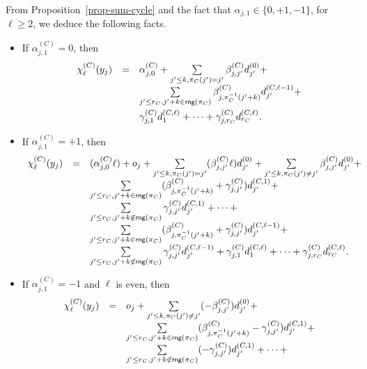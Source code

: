 \documentclass[runningheads,a4paper]{llncs}
\newcommand\rng{\mathsf{rng}}
\begin{document}
From Proposition~\ref{prop-sum-cycle} and the fact that $\alpha_{j,1} \in \{0,+1,-1\}$, for $\ell \ge 2$, we deduce the following facts.
\begin{itemize}
\item If $\alpha^{(C)}_{j,1}=0$, then
\[
\begin{array}{l c l}
\chi^{(C)}_{\ell}(y_j)  & = & \alpha^{(C)}_{j,0} +  \sum \limits_{j' \le k, \pi_C(j')=j'} \beta^{(C)}_{j,j'} d^{(0)}_{j'} +
\\
\smallskip
& & \sum \limits_{j' \le r_C, j'+k \in \rng(\pi_C)} \beta^{(C)}_{j, \pi_C^{-1}(j'+k)} d^{(C,\ell-1)}_{j'} + \\
& & \gamma^{(C)}_{j, 1} d^{(C,\ell)}_{1} + \dots + \gamma^{(C)}_{j,r_C} d^{(C,\ell)}_{r_C}.
\end{array} 
\]
\item If $\alpha^{(C)}_{j,1}=+1$, then 
\[
\begin{array}{l c l}
\chi^{(C)}_{\ell}(y_j)  & = & (\alpha^{(C)}_{j,0} \ell) + o_j +   \sum \limits_{j' \le k, \pi_C(j')=j'} (\beta^{(C)}_{j,j'} \ell) d^{(0)}_{j'} + \sum \limits_{j'\le k, \pi_C(j') \neq j'} \beta^{(C)}_{j,j'} d^{(0)}_{j'} +  \\
%
& & \sum \limits_{j' \le r_C, j'+k \in \rng(\pi_C)} (\beta^{(C)}_{j, \pi_C^{-1}(j'+k)} + \gamma^{(C)}_{j,j'}) d^{(C,1)}_{j'} + \\
%
& & \sum \limits_{j' \le r_C,  j'+k \not \in \rng(\pi_C)} \gamma^{(C)}_{j,j'} d^{(C,1)}_{j'} + \dots + \\
%
& & \sum \limits_{j' \le r_C, j'+k \in \rng(\pi_C)} (\beta^{(C)}_{j, \pi_C^{-1}(j'+k)}+\gamma^{(C)}_{j,j'}) d^{(C,\ell-1)}_{j'} + \\
%
& & \sum \limits_{j' \le r_C,  j'+k \not \in \rng(\pi_C)} \gamma^{(C)}_{j,j'} d^{(C,\ell-1)}_{j'} + \gamma^{(C)}_{j, 1} d^{(C,\ell)}_{1} + \dots + \gamma^{(C)}_{j,r_C} d^{(C,\ell)}_{r_C}.
\end{array} 
\]
%
\item If $\alpha^{(C)}_{j,1}=-1$ and $\ell$ is even, then
\[
\begin{array}{l c l}
\chi^{(C)}_{\ell}(y_j)  & = &  o_j + \sum \limits_{j'\le k, \pi_C(j') \neq j'} (-\beta^{(C)}_{j,j'}) d^{(0)}_{j'} +  \\
%
& & \sum \limits_{j' \le r_C, j'+k \in \rng(\pi_C)} ( \beta^{(C)}_{j, \pi_C^{-1}(j'+k)} - \gamma^{(C)}_{j,j'}) d^{(C,1)}_{j'} + \\
%
& & \sum \limits_{j' \le r_C,  j'+k \not \in \rng(\pi_C)} (-\gamma^{(C)}_{j,j'}) d^{(C,1)}_{j'} + \dots + \\

\end{array}\]
\end{itemize}
\end{document}

